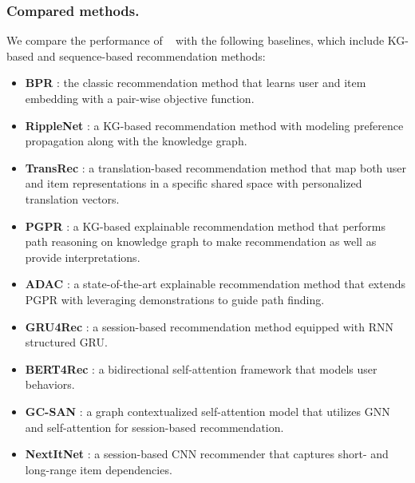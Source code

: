 \subsubsection{Compared methods.}
%
We compare the performance of \tkgrec~ with the following baselines, which include KG-based and sequence-based recommendation methods:
%
\begin{itemize}
%
\item \textbf{BPR} \cite{bpr}: the classic recommendation method that learns user and item embedding with a pair-wise objective function.
%
\item \textbf{RippleNet} \cite{ripplenet}: a KG-based recommendation method with modeling preference propagation along with the knowledge graph.
%
\item \textbf{TransRec} \cite{transRec}: a translation-based recommendation method that map both user and item representations in a specific shared space with
        personalized translation vectors.
%
%
\item \textbf{PGPR} \cite{pgpr}: a KG-based explainable recommendation method that performs path reasoning on knowledge graph to make recommendation as well as provide interpretations.
%
\item \textbf{ADAC} \cite{ADAC}: a state-of-the-art explainable recommendation method that extends PGPR with leveraging demonstrations to guide path finding.

\item \textbf{GRU4Rec} \cite{gru4rec}: a session-based recommendation method equipped with RNN structured GRU.

\item \textbf{BERT4Rec} \cite{bert4rec}: a bidirectional self-attention framework that models user behaviors.

\item \textbf{GC-SAN} \cite{gcsan}: a graph contextualized self-attention model that utilizes GNN and self-attention for session-based recommendation.

\item \textbf{NextItNet} \cite{nextit}: a session-based CNN recommender that captures short- and long-range item dependencies.


\end{itemize}
